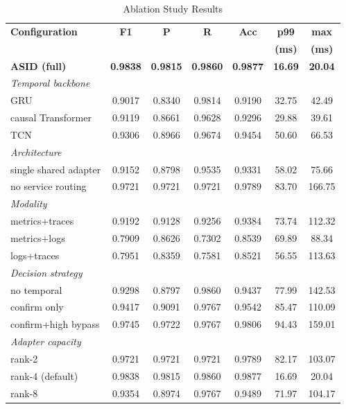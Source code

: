 \begin{table}[!t]
\caption{Ablation Study Results}
\label{tab:ablation}
\centering
\renewcommand{\arraystretch}{1.1}
\begin{tabular}{l|cccc|cc}
\hline
\textbf{Configuration} & \textbf{F1} & \textbf{P} & \textbf{R} & \textbf{Acc} & \textbf{p99} & \textbf{max} \\
 & & & & & \textbf{(ms)} & \textbf{(ms)} \\
\hline
\textbf{ASID (full)} & \textbf{0.9838} & \textbf{0.9815} & \textbf{0.9860} & \textbf{0.9877} & \textbf{16.69} & \textbf{20.04} \\
\hline
\multicolumn{7}{l}{\textit{Temporal backbone}} \\
\hline
GRU & 0.9017 & 0.8340 & 0.9814 & 0.9190 & 32.75 & 42.49 \\
causal Transformer & 0.9119 & 0.8661 & 0.9628 & 0.9296 & 29.88 & 39.61 \\
TCN & 0.9306 & 0.8966 & 0.9674 & 0.9454 & 50.60 & 66.53 \\
\hline
\multicolumn{7}{l}{\textit{Architecture}} \\
\hline
single shared adapter & 0.9152 & 0.8798 & 0.9535 & 0.9331 & 58.02 & 75.66 \\
no service routing & 0.9721 & 0.9721 & 0.9721 & 0.9789 & 83.70 & 166.75 \\
\hline
\multicolumn{7}{l}{\textit{Modality}} \\
\hline
metrics+traces & 0.9192 & 0.9128 & 0.9256 & 0.9384 & 73.74 & 112.32 \\
metrics+logs & 0.7909 & 0.8626 & 0.7302 & 0.8539 & 69.89 & 88.34 \\
logs+traces & 0.7951 & 0.8359 & 0.7581 & 0.8521 & 56.55 & 113.63 \\
\hline
\multicolumn{7}{l}{\textit{Decision strategy}} \\
\hline
no temporal & 0.9298 & 0.8797 & 0.9860 & 0.9437 & 77.99 & 142.53 \\
confirm only & 0.9417 & 0.9091 & 0.9767 & 0.9542 & 85.47 & 110.09 \\
confirm+high bypass & 0.9745 & 0.9722 & 0.9767 & 0.9806 & 94.43 & 159.01 \\
\hline
\multicolumn{7}{l}{\textit{Adapter capacity}} \\
\hline
rank-2 & 0.9721 & 0.9721 & 0.9721 & 0.9789 & 82.17 & 103.07 \\
rank-4 (default) & 0.9838 & 0.9815 & 0.9860 & 0.9877 & 16.69 & 20.04 \\
rank-8 & 0.9354 & 0.8974 & 0.9767 & 0.9489 & 71.97 & 104.17 \\
\hline
\end{tabular}
\end{table}

